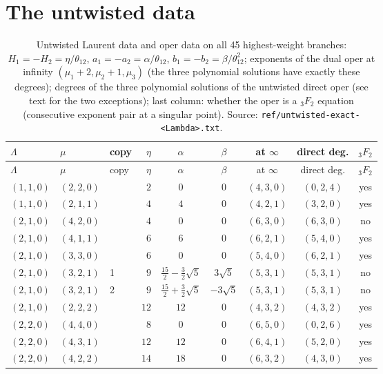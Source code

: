 \documentclass[11pt]{article}
\begin{document}
\section{The untwisted data}\label{app:E}

{\scriptsize
\begin{longtable}{lllrccccc}
\caption{Untwisted Laurent data and oper data on all 45 highest-weight branches: $H_1=-H_2=\eta/\theta_{12}$, $a_1=-a_2=\alpha/\theta_{12}$, $b_1=-b_2=\beta/\theta_{12}^2$; exponents of the dual oper at infinity $(\mu_1+2,\mu_2+1,\mu_3)$ (the three polynomial solutions have exactly these degrees); degrees of the three polynomial solutions of the untwisted direct oper (see text for the two exceptions); last column: whether the oper is a ${}_3F_2$ equation (consecutive exponent pair at a singular point).
Source: \texttt{ref/\allowbreak{}untwisted-\allowbreak{}exact-\allowbreak{}<Lambda>.\allowbreak{}txt}.}\label{tab:untw}\\
\toprule
$\Lambda$ & $\mu$ & copy & $\eta$ & $\alpha$ & $\beta$ & at $\infty$ & direct deg. & ${}_3F_2$ \\
\midrule
\endfirsthead
\toprule
$\Lambda$ & $\mu$ & copy & $\eta$ & $\alpha$ & $\beta$ & at $\infty$ & direct deg. & ${}_3F_2$ \\
\midrule
\endhead
\bottomrule
\endlastfoot
$(1,1,0)$ & $(2,2,0)$ &  & $2$ & $0$ & $0$ & $(4,3,0)$ & $(0,2,4)$ & yes \\
$(1,1,0)$ & $(2,1,1)$ &  & $4$ & $4$ & $0$ & $(4,2,1)$ & $(3,2,0)$ & yes \\
$(2,1,0)$ & $(4,2,0)$ &  & $4$ & $0$ & $0$ & $(6,3,0)$ & $(6,3,0)$ & no \\
$(2,1,0)$ & $(4,1,1)$ &  & $6$ & $6$ & $0$ & $(6,2,1)$ & $(5,4,0)$ & yes \\
$(2,1,0)$ & $(3,3,0)$ &  & $6$ & $0$ & $0$ & $(5,4,0)$ & $(6,2,1)$ & yes \\
$(2,1,0)$ & $(3,2,1)$ & 1 & $9$ & $\frac{15}{2}-\frac{3}{2}\sqrt{5}$ & $3\sqrt{5}$ & $(5,3,1)$ & $(5,3,1)$ & no \\
$(2,1,0)$ & $(3,2,1)$ & 2 & $9$ & $\frac{15}{2}+\frac{3}{2}\sqrt{5}$ & $-3\sqrt{5}$ & $(5,3,1)$ & $(5,3,1)$ & no \\
$(2,1,0)$ & $(2,2,2)$ &  & $12$ & $12$ & $0$ & $(4,3,2)$ & $(4,3,2)$ & yes \\
$(2,2,0)$ & $(4,4,0)$ &  & $8$ & $0$ & $0$ & $(6,5,0)$ & $(0,2,6)$ & yes \\
$(2,2,0)$ & $(4,3,1)$ &  & $12$ & $12$ & $0$ & $(6,4,1)$ & $(5,2,0)$ & yes \\
$(2,2,0)$ & $(4,2,2)$ &  & $14$ & $18$ & $0$ & $(6,3,2)$ & $(4,3,0)$ & yes \\

\end{longtable}}
\end{document}
